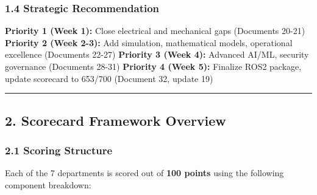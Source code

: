 \documentclass[
]{article}
\begin{document}
\hypertarget{strategic-recommendation}{%
\subsubsection{1.4 Strategic
Recommendation}\label{strategic-recommendation}}

\textbf{Priority 1 (Week 1):} Close electrical and mechanical gaps
(Documents 20-21) \textbf{Priority 2 (Week 2-3):} Add simulation,
mathematical models, operational excellence (Documents 22-27)
\textbf{Priority 3 (Week 4):} Advanced AI/ML, security governance
(Documents 28-31) \textbf{Priority 4 (Week 5):} Finalize ROS2 package,
update scorecard to 653/700 (Document 32, update 19)

\begin{center}\rule{0.5\linewidth}{0.5pt}\end{center}

\hypertarget{scorecard-framework-overview}{%
\subsection{2. Scorecard Framework
Overview}\label{scorecard-framework-overview}}

\hypertarget{scoring-structure}{%
\subsubsection{2.1 Scoring Structure}\label{scoring-structure}}

Each of the 7 departments is scored out of \textbf{100 points} using the
following component breakdown:
\end{document}
